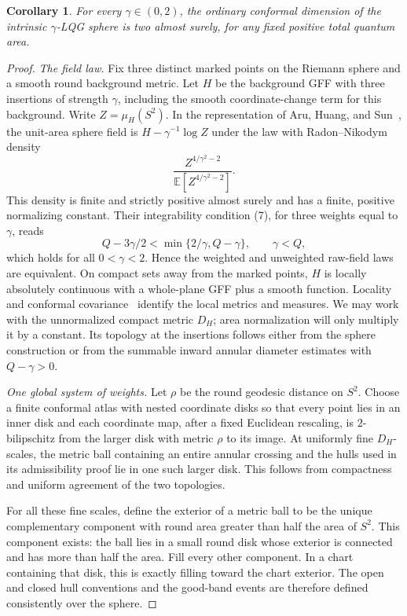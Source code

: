\documentclass[11pt,reqno]{amsart}
\theoremstyle{plain}
\newtheorem{corollary}[theorem]{Corollary}
\theoremstyle{definition}
\theoremstyle{remark}
\newcommand{\E}{\mathbb E}
\newcommand{\1}{\mathbf{1}}
\begin{document}
\begin{corollary}\label{cor:lqg-sphere}
For every $\gamma\in(0,2)$, the ordinary conformal dimension of the intrinsic $\gamma$-LQG sphere is two almost surely, for any fixed positive total quantum area.
\end{corollary}
\begin{proof}
\emph{The field law.} Fix three distinct marked points on the Riemann sphere and a smooth round background metric. Let $H$ be the background GFF with three insertions of strength $\gamma$, including the smooth coordinate-change term for this background. Write $Z=\mu_H(S^2)$. In the representation of Aru, Huang, and Sun~\cite[Definition 2.2, Theorem 1.1, and Remark 1.2]{AHS}, the unit-area sphere field is $H-\gamma^{-1}\log Z$ under the law with Radon--Nikodym density
\begin{equation*}
\frac{Z^{4/\gamma^2-2}}{\E[Z^{4/\gamma^2-2}]}.
\end{equation*}
This density is finite and strictly positive almost surely and has a finite, positive normalizing constant. Their integrability condition (7), for three weights equal to $\gamma$, reads
\begin{equation*}
Q-3\gamma/2<\min\{2/\gamma,Q-\gamma\},\qquad \gamma<Q,
\end{equation*}
which holds for all $0<\gamma<2$. Hence the weighted and unweighted raw-field laws are equivalent. On compact sets away from the marked points, $H$ is locally absolutely continuous with a whole-plane GFF plus a smooth function. Locality and conformal covariance~\cite[Theorem 1.3]{GMCov} identify the local metrics and measures. We may work with the unnormalized compact metric $D_H$; area normalization will only multiply it by a constant. Its topology at the insertions follows either from the sphere construction or from the summable inward annular diameter estimates with $Q-\gamma>0$.

\emph{One global system of weights.} Let $\rho$ be the round geodesic distance on $S^2$. Choose a finite conformal atlas with nested coordinate disks so that every point lies in an inner disk and each coordinate map, after a fixed Euclidean rescaling, is $2$-bilipschitz from the larger disk with metric $\rho$ to its image. At uniformly fine $D_H$-scales, the metric ball containing an entire annular crossing and the hulls used in its admissibility proof lie in one such larger disk. This follows from compactness and uniform agreement of the two topologies.

For all these fine scales, define the exterior of a metric ball to be the unique complementary component with round area greater than half the area of $S^2$. This component exists: the ball lies in a small round disk whose exterior is connected and has more than half the area. Fill every other component. In a chart containing that disk, this is exactly filling toward the chart exterior. The open and closed hull conventions and the good-band events are therefore defined consistently over the sphere.


\end{proof}
\end{document}
